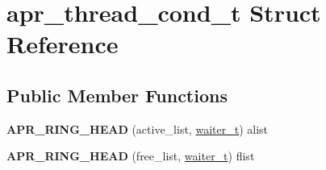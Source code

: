 \hypertarget{structapr__thread__cond__t}{}\section{apr\+\_\+thread\+\_\+cond\+\_\+t Struct Reference}
\label{structapr__thread__cond__t}
\subsection*{Public Member Functions}
\begin{DoxyCompactItemize}
\item 
\mbox{\label{structapr__thread__cond__t_a1bc8b19ee763a078844517a30e96abda}} 
{\bfseries A\+P\+R\+\_\+\+R\+I\+N\+G\+\_\+\+H\+E\+AD} (active\+\_\+list, \mbox{\hyperlink{structwaiter__t}{waiter\+\_\+t}}) alist
\item 
\mbox{\label{structapr__thread__cond__t_a7b569e0b5640e2858441ea18359636d9}} 
{\bfseries A\+P\+R\+\_\+\+R\+I\+N\+G\+\_\+\+H\+E\+AD} (free\+\_\+list, \mbox{\hyperlink{structwaiter__t}{waiter\+\_\+t}}) flist
\end{DoxyCompactItemize}
